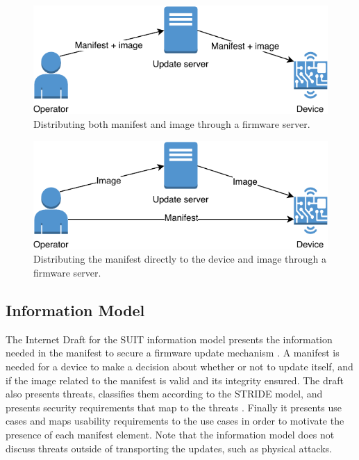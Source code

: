 \documentclass[0-thesis.tex]{subfiles}
\begin{document}
\begin{figure}
    \caption{Distributing both manifest and image through a firmware server.}   
    \label{fig:manifest-image-combined-distribution}
    \includegraphics{images/together.pdf}
\end{figure}

\begin{figure}
    \caption{Distributing the manifest directly to the device and image through a firmware server.}
    \label{fig:manifest-image-separate-distribution}
    \includegraphics{images/separate.pdf}
\end{figure}

\subsection{Information Model}
\label{ssec:information-model}
The Internet Draft for the SUIT information model presents the information needed in the
manifest to secure a firmware update mechanism \parencite{suit-information-model}. A
manifest is needed for a device to make a decision about whether or not to update itself,
and if the image related to the manifest is valid and its integrity ensured. The draft
also presents threats, classifies them according to the STRIDE model, and presents
security requirements that map to the threats \parencite{stride}. Finally it presents use
cases and maps usability requirements to the use cases in order to motivate the presence
of each manifest element. Note that the information model does not discuss threats outside
of transporting the updates, such as physical attacks.
\end{document}
